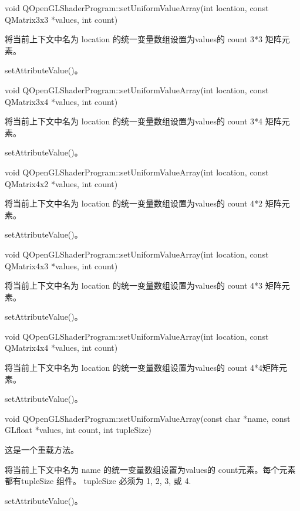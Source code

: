 void QOpenGLShaderProgram::setUniformValueArray(int location, const QMatrix3x3 *values, int count)

将当前上下文中名为 location 的统一变量数组设置为values的 count 3*3 矩阵元素。

\begin{seeAlso}
setAttributeValue()。
\end{seeAlso}

void QOpenGLShaderProgram::setUniformValueArray(int location, const QMatrix3x4 *values, int count)

将当前上下文中名为 location 的统一变量数组设置为values的 count 3*4 矩阵元素。

\begin{seeAlso}
setAttributeValue()。
\end{seeAlso}

void QOpenGLShaderProgram::setUniformValueArray(int location, const QMatrix4x2 *values, int count)

将当前上下文中名为 location 的统一变量数组设置为values的 count 4*2 矩阵元素。


\begin{seeAlso}
setAttributeValue()。
\end{seeAlso}

void QOpenGLShaderProgram::setUniformValueArray(int location, const QMatrix4x3 *values, int count)

将当前上下文中名为 location 的统一变量数组设置为values的 count 4*3 矩阵元素。

\begin{seeAlso}
setAttributeValue()。
\end{seeAlso}

void QOpenGLShaderProgram::setUniformValueArray(int location, const QMatrix4x4 *values, int count)

将当前上下文中名为 location 的统一变量数组设置为values的 count 4*4矩阵元素。


\begin{seeAlso}
setAttributeValue()。
\end{seeAlso}

void QOpenGLShaderProgram::setUniformValueArray(const char *name, const GLfloat *values, int count, int tupleSize)

这是一个重载方法。

将当前上下文中名为 name 的统一变量数组设置为values的 count元素。每个元素都有tupleSize 组件。 tupleSize 必须为 1, 2, 3, 或 4.

\begin{seeAlso}
setAttributeValue()。
\end{seeAlso}

